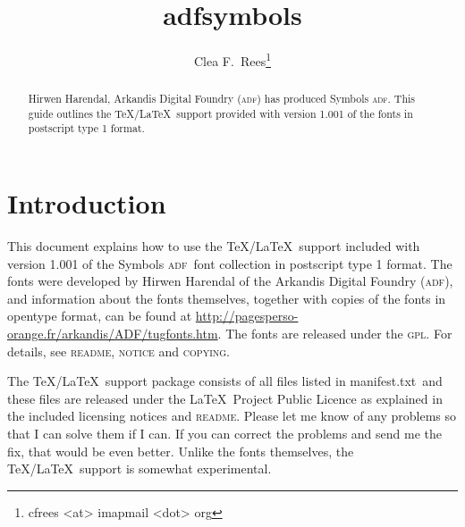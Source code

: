 \documentclass[10pt,british]{article}
\title{adfsymbols}
\author{Clea F.\ Rees\footnote{cfrees <at> imapmail <dot> org}}
\date{\dyddiad}
\begin{document}
\maketitle\thispagestyle{empty}
\setlength{\parindent}{0pt}
\setlength{\parskip}{0.5em}
	
	
\newcommand*{\adf}{\textsc{adf}}
\newcommand*{\lpack}[1]{\textsf{#1}}
\newcommand*{\fgroup}[1]{\textsf{#1}}
\newcommand*{\fname}[1]{\textsf{#1}}

\begin{abstract}
	\hspace*{-\parindent}Hirwen Harendal, Arkandis Digital Foundry (\adf) has produced Symbols \adf. This guide outlines the \TeX/\LaTeX\ support provided with version 1.001 of the fonts in postscript type 1 format.
\end{abstract}

\section{Introduction}

This document explains how to use the \TeX/\LaTeX\ support included with version 1.001 of the Symbols \adf\ font collection in postscript type 1 format. The fonts were developed by Hirwen Harendal of the Arkandis Digital Foundry (\adf), and information about the fonts themselves, together with copies of the fonts in opentype format, can be found at \url{http://pagesperso-orange.fr/arkandis/ADF/tugfonts.htm}. The fonts are released under the \textsc{gpl}. For details, see \textsc{readme}, \textsc{notice} and \textsc{copying}.

The \TeX/\LaTeX\ support package consists of all files listed in \lpack{manifest.txt}\ and these files are released under the \LaTeX\ Project Public Licence as explained in the included licensing notices and \textsc{readme}. Please let me know of any problems so that I can solve them if I can. If you can correct the problems and send me the fix, that would be even better. Unlike the fonts themselves, the \TeX/\LaTeX\ support is somewhat experimental. 
\end{document}
